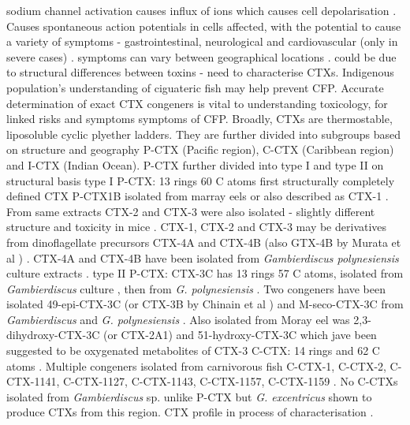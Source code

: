 \documentclass[12pt]{article}
\begin{document}
sodium channel activation causes influx of  ions which causes cell depolarisation \cite{mattei1999neurotoxins,lewis1992action,molgo2000ciguatera}.
Causes spontaneous action potentials in cells affected, with the potential to cause a variety of symptoms - gastrointestinal, neurological and cardiovascular (only in severe cases) \cite{sims1987theoretical}.
symptoms can vary between geographical locations \cite{molgo2000ciguatera,dickey2010ciguatera}. could be due to structural differences between toxins - need to characterise CTXs. Indigenous population's understanding of ciguateric fish may help prevent CFP. Accurate determination of exact CTX congeners is vital to understanding toxicology, for linked risks and symptoms symptoms of CFP.
Broadly, CTXs are thermostable, liposoluble cyclic plyether ladders. They are further divided into subgroups based on structure and geography P-CTX (Pacific region), C-CTX (Caribbean region) and I-CTX (Indian Ocean). P-CTX further divided into type I and type II on structural basis %
type I P-CTX: 13 rings 60 C atoms \cite{murata1990structures,lewis1991purification,lewis1993origin} first structurally completely defined CTX P-CTX1B isolated from marray eels \cite{murata1990structures} or also described as CTX-1 \cite{lewis1991purification}. From same extracts CTX-2 and CTX-3 were also isolated - slightly different structure and toxicity in mice \cite{lewis1991purification}. CTX-1, CTX-2 and CTX-3 may be derivatives from dinoflagellate precursors CTX-4A and CTX-4B (also GTX-4B by Murata et al \cite{murata1990structures}) \cite{lewis1993origin,yasumoto2000structural}. CTX-4A and CTX-4B have been isolated from \emph{Gambierdiscus polynesiensis} culture extracts \cite{chinain2010growth}.
type II P-CTX: CTX-3C has 13 rings 57 C atoms, isolated from \emph{Gambierdiscus} culture \cite{satake1993structure}, then from \emph{G. polynesiensis} \cite{chinain2010growth}. Two congeners have been isolated 49-epi-CTX-3C (or CTX-3B by Chinain et al \cite{chinain2010growth}) and M-seco-CTX-3C from \emph{Gambierdiscus} \cite{satake1993structure} and \emph{G. polynesiensis} \cite{chinain2010growth}. Also isolated from Moray eel was 2,3-dihydroxy-CTX-3C (or CTX-2A1) and 51-hydroxy-CTX-3C \cite{satake1998isolation} which jave been suggested to be oxygenated metabolites of CTX-3 \cite{yasumoto2000structural}
C-CTX: 14 rings and 62 C atoms \cite{vernoux1997isolation,lewis1998structure,pottier2003identification,pottier2002characterisation}. Multiple congeners isolated from carnivorous fish C-CTX-1, C-CTX-2, C-CTX-1141, C-CTX-1127, C-CTX-1143, C-CTX-1157, C-CTX-1159 \cite{vernoux1997isolation,lewis1998structure,pottier2003identification,pottier2002characterisation}. No C-CTXs isolated from \emph{Gambierdiscus} sp. unlike P-CTX but \emph{G. excentricus} shown to produce CTXs from this region. CTX profile in process of characterisation \cite{fraga2011gambierdiscus}.
\end{document}
